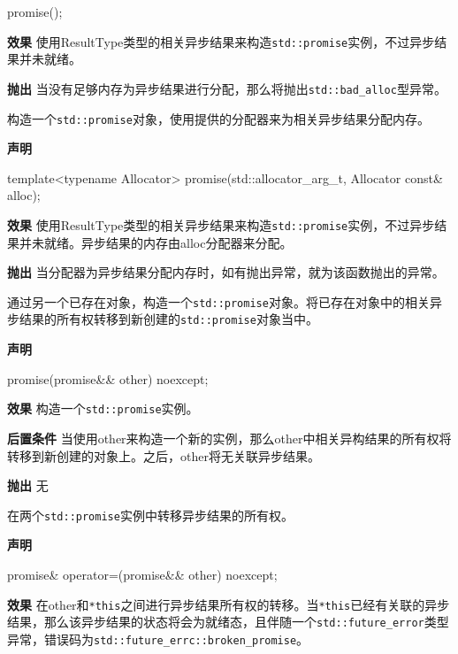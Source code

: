 \begin{cpp}
promise();
\end{cpp}

\textbf{效果}
使用ResultType类型的相关异步结果来构造\texttt{std::promise}实例，不过异步结果并未就绪。

\textbf{抛出}
当没有足够内存为异步结果进行分配，那么将抛出\texttt{std::bad\_alloc}型异常。


构造一个\texttt{std::promise}对象，使用提供的分配器来为相关异步结果分配内存。

\textbf{声明}

\begin{cpp}
template<typename Allocator>
promise(std::allocator_arg_t, Allocator const& alloc);
\end{cpp}

\textbf{效果}
使用ResultType类型的相关异步结果来构造\texttt{std::promise}实例，不过异步结果并未就绪。异步结果的内存由alloc分配器来分配。

\textbf{抛出}
当分配器为异步结果分配内存时，如有抛出异常，就为该函数抛出的异常。


通过另一个已存在对象，构造一个\texttt{std::promise}对象。将已存在对象中的相关异步结果的所有权转移到新创建的\texttt{std::promise}对象当中。

\textbf{声明}

\begin{cpp}
promise(promise&& other) noexcept;
\end{cpp}

\textbf{效果}
构造一个\texttt{std::promise}实例。

\textbf{后置条件}
当使用other来构造一个新的实例，那么other中相关异构结果的所有权将转移到新创建的对象上。之后，other将无关联异步结果。

\textbf{抛出}
无


在两个\texttt{std::promise}实例中转移异步结果的所有权。

\textbf{声明}

\begin{cpp}
promise& operator=(promise&& other) noexcept;
\end{cpp}

\textbf{效果}
在other和\texttt{*this}之间进行异步结果所有权的转移。当\texttt{*this}已经有关联的异步结果，那么该异步结果的状态将会为就绪态，且伴随一个\texttt{std::future\_error}类型异常，错误码为\texttt{std::future\_errc::broken\_promise}。

